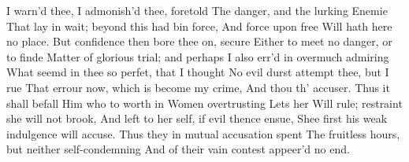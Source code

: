 \documentclass[11pt]{book}
\newcounter {first}
\begin{document}
I warn'd thee, I admonish'd thee, foretold 
The danger, and the lurking Enemie 
That lay in wait; beyond this had bin force, 
And force upon free Will hath here no place. 
But confidence then bore thee on, secure 
Either to meet no danger, or to finde 
Matter of glorious trial; and perhaps 
I also err'd in overmuch admiring 
What seemd in thee so perfet, that I thought 
No evil durst attempt thee, but I rue 
That errour now, which is become my crime, 
And thou th' accuser.  Thus it shall befall 
Him who to worth in Women overtrusting 
Lets her Will rule; restraint she will not brook, 
And left to her self, if evil thence ensue, 
Shee first his weak indulgence will accuse. 
\quad Thus they in mutual accusation spent 
The fruitless hours, but neither self-condemning 
And of their vain contest appeer'd no end. 


\Book
 
\end{document}
